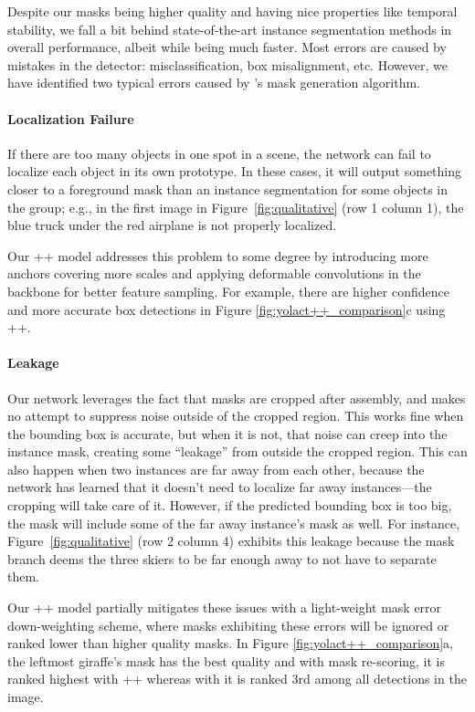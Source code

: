 \documentclass[10pt,journal,compsoc]{IEEEtran}
\begin{document}
Despite our masks being higher quality and having nice properties like temporal stability, we fall a bit behind state-of-the-art instance segmentation methods in overall performance, albeit while being much faster. Most errors are caused by mistakes in the detector: misclassification, box misalignment, etc. However, we have identified two typical errors caused by \methodname{}'s mask generation algorithm.


\paragraph{Localization Failure}
If there are too many objects in one spot in a scene, the network can fail to localize each object in its own prototype. In these cases, it will output something closer to a foreground mask than an instance segmentation for some objects in the group; e.g., in the first image in Figure~\ref{fig:qualitative} (row 1 column 1), the blue truck under the red airplane is not properly localized.


Our \methodname++ model addresses this problem to some degree by introducing more anchors covering more scales and applying deformable convolutions in the backbone for better feature sampling. For example, there are higher confidence and more accurate box detections in Figure \ref{fig:yolact++_comparison}c using \methodname{}++.

\paragraph{Leakage}
Our network leverages the fact that masks are cropped after assembly, and makes no attempt to suppress noise outside of the cropped region. This works fine when the bounding box is accurate, but when it is not, that noise can creep into the instance mask, creating some ``leakage'' from outside the cropped region. This can also happen when two instances are far away from each other, because the network has learned that it doesn't need to localize far away instances---the cropping will take care of it. However, if the predicted bounding box is too big, the mask will include some of the far away instance's mask as well. For instance, Figure~\ref{fig:qualitative} (row 2 column 4) exhibits this leakage because the mask branch deems the three skiers to be far enough away to not have to separate them.
 
Our \methodname++ model partially mitigates these issues with a light-weight mask error down-weighting scheme, where masks exhibiting these errors will be ignored or ranked lower than higher quality masks. In Figure \ref{fig:yolact++_comparison}a, the leftmost giraffe's mask has the best quality and with mask re-scoring, it is ranked highest with \methodname{}++ whereas with \methodname{} it is ranked 3rd among all detections in the image. 
\end{document}
